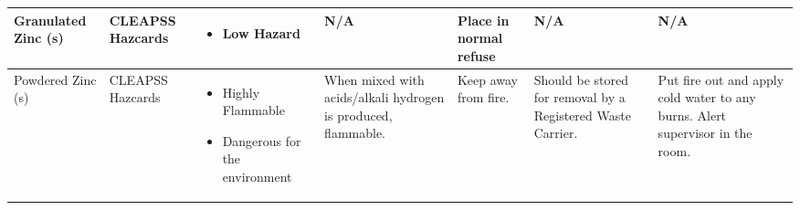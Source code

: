 \begin{landscape}
\begin{center}
\begin{longtable}{|p{1.5cm}|p{1.5cm}|p{3cm}|p{3cm}|p{3cm}|p{3cm}|p{2cm}|}
Granulated Zinc (s) &
CLEAPSS Hazcards &
\begin{itemize}
\item Low Hazard \end{itemize} &
N/A &
Place in normal refuse &
N/A &
N/A \\ \hline

Powdered Zinc (s) &
CLEAPSS Hazcards &
\begin{itemize}
\item Highly Flammable
\item Dangerous for the environment \end{itemize} &
When mixed with acids/alkali hydrogen is produced, flammable. &
Keep away from fire. &
Should be stored for removal by a Registered Waste Carrier. &
Put fire out and apply cold water to any burns. Alert supervisor in the room.
\\ \hline 

\end{longtable}
\label{tab:Risk Assessment Table}

\end{center}


\end{landscape}



